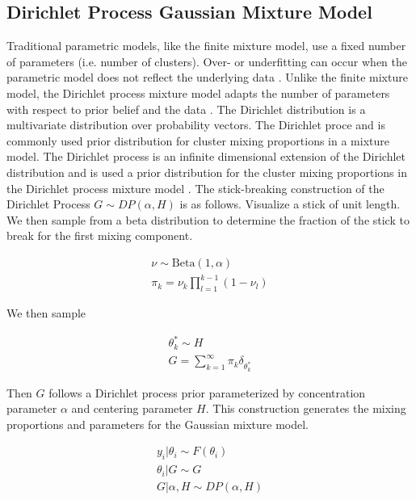 \documentclass[10pt,letterpaper]{article}
\begin{document}
\subsection{Dirichlet Process Gaussian Mixture Model}
Traditional parametric models, like the finite mixture model, use a fixed number of parameters (i.e. number of clusters). Over- or underfitting can occur when the parametric model does not reflect the underlying data \cite{teh2010dirichlet}. Unlike the finite mixture model, the Dirichlet process mixture model adapts the number of parameters with respect to prior belief and the data \cite{gelmanBayesianDataAnalysis2013, antoniakMixturesDirichletProcesses1974}. The Dirichlet distribution is a multivariate distribution over probability vectors. The Dirichlet proce and is commonly used prior distribution for cluster mixing proportions in a mixture model. The Dirichlet process is an infinite dimensional extension of the Dirichlet distribution and is used a prior distribution for the cluster mixing proportions in the Dirichlet process mixture model \cite{muller2004nonparametric, gorurDirichletProcessGaussian2010}. The stick-breaking construction of the Dirichlet Process $G \sim DP(\alpha, H)$ is as follows. Visualize a stick of unit length. We then sample from a beta distribution to determine the fraction of the stick to break for the first mixing component. 

\begin{eqnarray}
\label{eq:dp}
\nu \sim \text{Beta}(1, \alpha) \nonumber \\
\pi_k = \nu_k \prod_{l=1}^{k-1}(1 - \nu_l) \nonumber
\end{eqnarray}

We then sample 

\begin{eqnarray}
\theta_k^{*} \sim H \nonumber \\
G = \sum_{k=1}^{\infty} \pi_k \delta_{\theta_k^{*}} \nonumber
\end{eqnarray}

Then $G$ follows a Dirichlet process prior parameterized by concentration parameter $\alpha$ and centering parameter $H$. This construction generates the mixing proportions and parameters for the Gaussian mixture model.

\begin{eqnarray}
\label{eq:mm}
y_i | \theta_{i} \sim F(\theta_i) \nonumber \\
\theta_i | G \sim G \nonumber \\
G | \alpha, H \sim DP(\alpha, H) \nonumber
\end{eqnarray}
\end{document}
